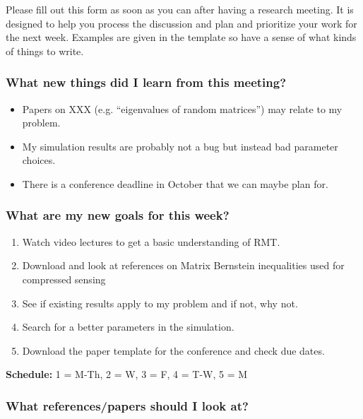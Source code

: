 \documentclass[10pt, letter]{article}
\begin{document}

\noindent Please fill out this form as soon as you can after having a research meeting. It is designed to help you process the discussion and plan and prioritize your work for the next week. Examples are given in the template so have a sense of what kinds of things to write.


\subsubsection*{What new things did I learn from this meeting?}

\begin{note}
\begin{itemize}
\item Papers on XXX (e.g. ``eigenvalues of random matrices'') may relate to my problem.
\item My simulation results are probably not a bug but instead bad parameter choices.
\item There is a conference deadline in October that we can maybe plan for.
\end{itemize}
\end{note}


\subsubsection*{What are my new goals for this week?}

\begin{note}
	\begin{enumerate}
	\item Watch video lectures to get a basic understanding of RMT.
	\item Download and look at references on Matrix Bernstein inequalities used for compressed sensing 
	\item See if existing results apply to my problem and if not, why not.
	\item Search for a better parameters in the simulation.
	\item Download the paper template for the conference and check due dates.
	\end{enumerate}
\textbf{Schedule:} 1 = M-Th, 2 = W, 3 = F, 4 = T-W, 5 = M
\end{note}


\subsubsection*{What references/papers should I look at?}
\end{document}
